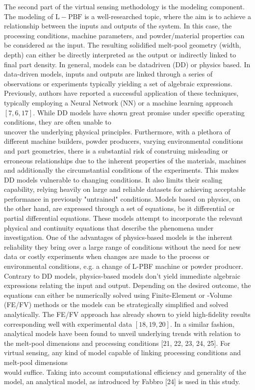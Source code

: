 \documentclass[10pt]{article}
\begin{document}
The second part of the virtual sensing methodology is the modeling component. The modeling of $\mathrm{L}-\mathrm{PBF}$ is a well-researched topic, where the aim is to achieve a relationship between the inputs and outputs of the system. In this case, the processing conditions, machine parameters, and powder/material properties can be considered as the input. The resulting solidified melt-pool geometry (width, depth) can either be directly interpreted as the output or indirectly linked to final part density. In general, models can be datadriven (DD) or physics based. In data-driven models, inputs and outputs are linked through a series of observations or experiments typically yielding a set of algebraic expressions. Previously, authors have reported a successful application of these techniques, typically employing a Neural Network (NN) or a machine learning approach $[7,6,17]$. While DD models have shown great promise under specific operating conditions, they are often unable to\\
uncover the underlying physical principles. Furthermore, with a plethora of different machine builders, powder producers, varying environmental conditions and part geometries, there is a substantial risk of construing misleading or erroneous relationships due to the inherent properties of the materials, machines and additionally the circumstantial conditions of the experiments. This makes DD models vulnerable to changing conditions. It also limits their scaling capability, relying heavily on large and reliable datasets for achieving acceptable performance in previously "untrained" conditions. Models based on physics, on the other hand, are expressed through a set of equations, be it differential or partial differential equations. These models attempt to incorporate the relevant physical and continuity equations that describe the phenomena under investigation. One of the advantages of physics-based models is the inherent reliability they bring over a large range of conditions without the need for new data or costly experiments when changes are made to the process or environmental conditions, e.g. a change of L-PBF machine or powder producer. Contrary to DD models, physics-based models don't yield immediate algebraic expressions relating the input and output. Depending on the desired outcome, the equations can either be numerically solved using Finite-Element or -Volume (FE/FV) methods or the models can be strategically simplified and solved analytically. The FE/FV approach has already shown to yield high-fidelity results corresponding well with experimental data $[18,19,20]$. In a similar fashion, analytical models have been found to unveil underlying trends with relation to the melt-pool dimensions and processing conditions [21, 22, 23, 24, 25]. For virtual sensing, any kind of model capable of linking processing conditions and melt-pool dimensions\\
would suffice. Taking into account computational efficiency and generality of the model, an analytical model, as introduced by Fabbro [24] is used in this study.
\end{document}
